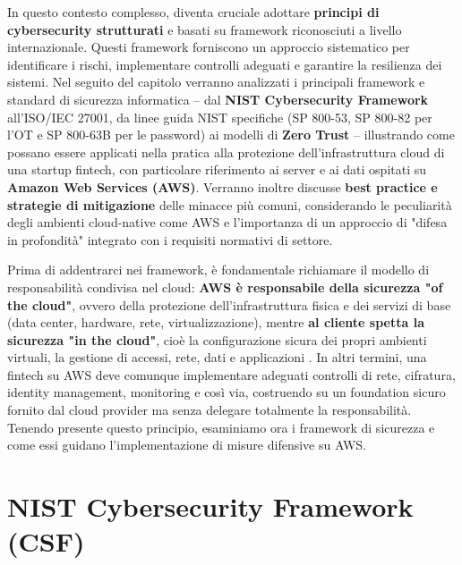 \documentclass[a4paper,12pt]{report}
\begin{document}
In questo contesto complesso, diventa cruciale adottare \textbf{principi di cybersecurity strutturati} e basati su framework riconosciuti a livello internazionale. Questi framework forniscono un approccio sistematico per identificare i rischi, implementare controlli adeguati e garantire la resilienza dei sistemi. Nel seguito del capitolo verranno analizzati i principali framework e standard di sicurezza informatica – dal \textbf{NIST Cybersecurity Framework} all'ISO/IEC 27001, da linee guida NIST specifiche (SP 800-53, SP 800-82 per l'OT e SP 800-63B per le password) ai modelli di \textbf{Zero Trust} – illustrando come possano essere applicati nella pratica alla protezione dell'infrastruttura cloud di una startup fintech, con particolare riferimento ai server e ai dati ospitati su \textbf{Amazon Web Services (AWS)}. Verranno inoltre discusse \textbf{best practice e strategie di mitigazione} delle minacce più comuni, considerando le peculiarità degli ambienti cloud-native come AWS e l'importanza di un approccio di "difesa in profondità" integrato con i requisiti normativi di settore.

Prima di addentrarci nei framework, è fondamentale richiamare il modello di responsabilità condivisa nel cloud: \textbf{AWS è responsabile della sicurezza "of the cloud"}, ovvero della protezione dell'infrastruttura fisica e dei servizi di base (data center, hardware, rete, virtualizzazione), mentre \textbf{al cliente spetta la sicurezza "in the cloud"}, cioè la configurazione sicura dei propri ambienti virtuali, la gestione di accessi, rete, dati e applicazioni \cite{awsResponsibility}. In altri termini, una fintech su AWS deve comunque implementare adeguati controlli di rete, cifratura, identity management, monitoring e così via, costruendo su un foundation sicuro fornito dal cloud provider ma senza delegare totalmente la responsabilità. Tenendo presente questo principio, esaminiamo ora i framework di sicurezza e come essi guidano l'implementazione di misure difensive su AWS.

\section{NIST Cybersecurity Framework (CSF)}
\label{sec:nist_csf}
\end{document}
